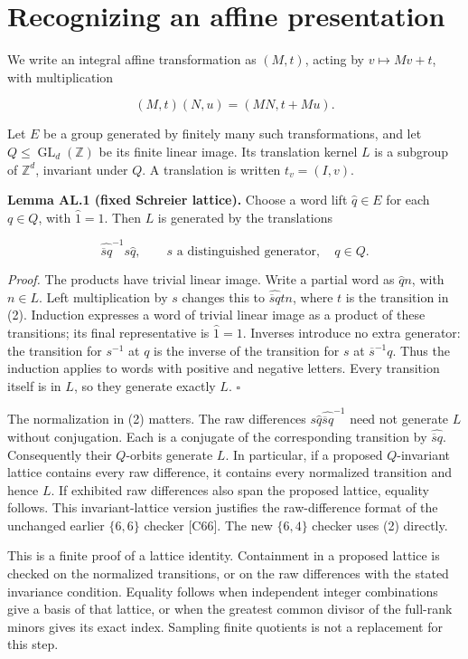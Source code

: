 \section{Recognizing an affine presentation}\label{recognizing-an-affine-presentation}

We write an integral affine transformation as \((M,t)\), acting by
\(v\mapsto Mv+t\), with multiplication

\[ (M,t)(N,u)=(MN,t+Mu). \tag{1} \]

Let \(E\) be a group generated by finitely many such transformations, and
let \(Q\leq\operatorname{GL}_d(\mathbb Z)\) be its finite linear image.
Its translation kernel \(L\) is a subgroup of \(\mathbb Z^d\), invariant under
\(Q\). A translation is written \(t_v=(I,v)\).

\textbf{Lemma AL.1 (fixed Schreier lattice).} Choose a word lift \(\widehat q\in E\)
for each \(q\in Q\), with \(\widehat1=1\). Then \(L\) is generated by the
translations

\[\widehat{\overline s q}^{-1}s\widehat q,\qquad
s\text{ a distinguished generator},\quad q\in Q.\tag{2}\]

\emph{Proof.} The products have trivial linear image. Write a partial word
as \(\widehat q n\), with \(n\in L\). Left multiplication by \(s\) changes
this to \(\widehat{\overline s q}t n\), where \(t\) is the transition in
(2). Induction expresses a word of trivial linear image as a product
of these transitions; its final representative is \(\widehat1=1\).
Inverses introduce no extra generator: the transition for $s^{-1}$ at $q$ is the inverse of the transition for $s$ at $\overline{s}^{-1}q$. Thus the induction applies to words with positive and negative letters. Every transition itself is in \(L\), so they generate exactly \(L\).
\(\square\)

The normalization in (2) matters. The raw differences
\(s\widehat q\widehat{\overline s q}^{-1}\) need not generate \(L\)
without conjugation. Each is a conjugate of the corresponding transition
by \(\widehat{\overline s q}\). Consequently their \(Q\)-orbits generate
\(L\). In particular, if a proposed \(Q\)-invariant lattice contains every
raw difference, it contains every normalized transition and hence \(L\).
If exhibited raw differences also span the proposed lattice, equality
follows. This invariant-lattice version justifies the raw-difference
format of the unchanged earlier \(\{6,6\}\) checker {[}C66{]}. The new
\(\{6,4\}\) checker uses (2) directly.

This is a finite proof of a lattice identity. Containment in a proposed
lattice is checked on the normalized transitions, or on the raw differences
with the stated invariance condition. Equality follows when independent
integer combinations give a basis of that lattice, or when the greatest
common divisor of the full-rank minors gives its exact index. Sampling
finite quotients is not a replacement for this step.

